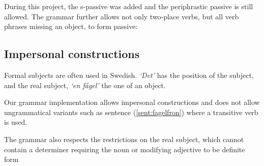 \documentclass[10pt, a4paper]{article}
\begin{document}
During this project, the s-passive was added and the
periphrastic passive is still allowed.
The grammar further allows not only two-place verbs, but all verb phrases missing an object, to 
form passive:
\label{sent:give2pass}
\label{ex:passV33}
\label{ex:passV32}
\label{ex:passV2A}

\subsection{Impersonal constructions}
\label{sec:Formal}
Formal subjects \cite[]{SAG} are often used in
Swedish.
\emph{`Det'} has the position of the subject, and the real subject, 
\emph{`en f{\aa}gel'} the one of an object.

Our grammar implementation allows impersonal constructions 
and does not allow ungrammatical variants such as sentence
(\ref{sent:fagelfron}) where a transitive verb is used.


The grammar also respects the restrictions on the real subject, which cannot
contain a determiner requiring the noun or modifying adjective to be definite form \cite{Cooper}
\label{sent:dumfagel}
 
\end{document}
